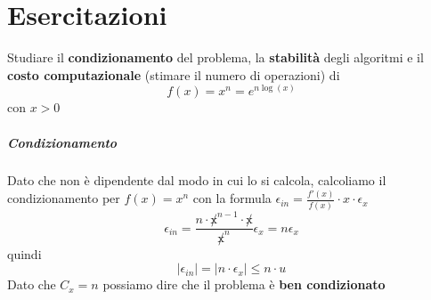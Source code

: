 \documentclass[10pt]{book}
\begin{document}
\chapter{Esercitazioni}
Studiare il \textbf{condizionamento} del problema, la \textbf{stabilità} degli algoritmi e il \textbf{costo computazionale} (stimare il numero di operazioni) di $$f(x) = x^n = e^{n\log(x)}$$ con $x > 0$
\paragraph{Condizionamento} Dato che non è dipendente dal modo in cui lo si calcola, calcoliamo il condizionamento per $f(x) = x^n$ con la formula $\epsilon_{in} = \frac{f'(x)}{f(x)}\cdot x\cdot\epsilon_x$ $$\epsilon_{in} = \frac{n\cdot \not x^{n-1} \cdot \not x}{\not x^n}\epsilon_x = n\epsilon_x$$ quindi $$|\epsilon_{in}| = |n\cdot \epsilon_x| \leq n\cdot u$$
Dato che $C_x = n$ possiamo dire che il problema è \textbf{ben condizionato}
\end{document}
